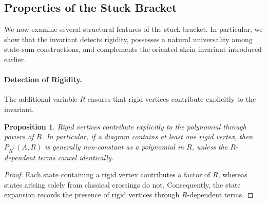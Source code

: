\documentclass[11pt,a4paper]{article}
\theoremstyle{plain}
\newtheorem{proposition}[theorem]{Proposition}
\theoremstyle{definition}
\begin{document}
\subsection{Properties of the Stuck Bracket}

We now examine several structural features of the stuck bracket. In particular, we show that the invariant detects rigidity, possesses a natural universality among state-sum constructions, and complements the oriented skein invariant introduced earlier.

\paragraph{Detection of Rigidity.}

The additional variable $R$ ensures that rigid vertices contribute explicitly to the invariant.

\begin{proposition}
Rigid vertices contribute explicitly to the polynomial through powers of $R$. In particular, if a diagram contains at least one rigid vertex, then $P_{K^*}(A,R)$ is generally non-constant as a polynomial in $R$, unless the $R$-dependent terms cancel identically.
\end{proposition}

\begin{proof}
Each state containing a rigid vertex contributes a factor of $R$, whereas states arising solely from classical crossings do not. Consequently, the state expansion records the presence of rigid vertices through $R$-dependent terms.
\end{proof}
\end{document}
